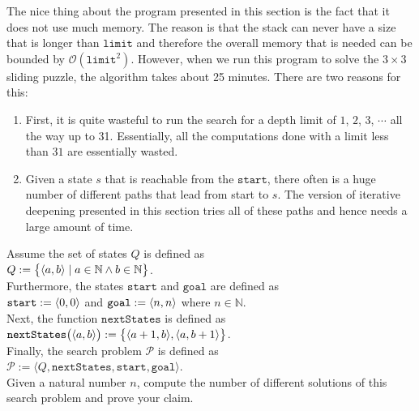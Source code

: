 The nice thing about the program presented in this section is the fact that it does not use much
memory.  The reason is that the stack can never have a size that is longer than $\mathtt{limit}$ and
therefore the overall memory that is needed can be bounded by $\mathcal{O}(\mathtt{limit}^2)$.
However, when we run this program to solve the $3 \times 3$ sliding puzzle, the algorithm takes
about 25 minutes.  There are two reasons for this:
\begin{enumerate}
\item First, it is quite wasteful to run the search for a depth limit of $1$, $2$, $3$, $\cdots$ all the way up
      to 31.  Essentially, all the computations done with a limit less than $31$ are essentially wasted.
\item Given a state $s$ that is reachable from the $\mathtt{start}$, there often is a huge number of
      different paths that lead from start to $s$.  The version of iterative deepening presented in
      this section tries all of these paths and hence needs a large amount of time.
\end{enumerate}

\exercise
Assume the set of states $Q$ is defined as
\\[0.2cm]
\hspace*{1.3cm}
$Q := \bigl\{ \pair(a, b) \mid a \in \mathbb{N} \wedge b \in \mathbb{N} \bigr\}$.
\\[0.2cm]
Furthermore, the states $\mathtt{start}$ and $\mathtt{goal}$ are defined as
\\[0.2cm]
\hspace*{1.3cm}
$\mathtt{start} := \pair(0,0)$ \quad and \quad $\mathtt{goal} := \pair(n,n)$ where $n \in \mathbb{N}$.
\\[0.2cm]
Next, the function $\mathtt{nextStates}$ is defined as
\\[0.2cm]
\hspace*{1.3cm}
$\mathtt{nextStates}\bigl(\pair(a,b)\bigr) := \bigl\{\pair(a+1,b), \pair(a,b+1)\bigr\}$.
\\[0.2cm]
Finally, the search problem $\mathcal{P}$ is defined as
\\[0.2cm]
\hspace*{1.3cm}
$\mathcal{P} := \langle Q, \mathtt{nextStates}, \mathtt{start}, \mathtt{goal} \rangle$.
\\[0.2cm]
Given a natural number $n$, compute the number of different solutions of this search problem and prove
your claim.
\eoxs

